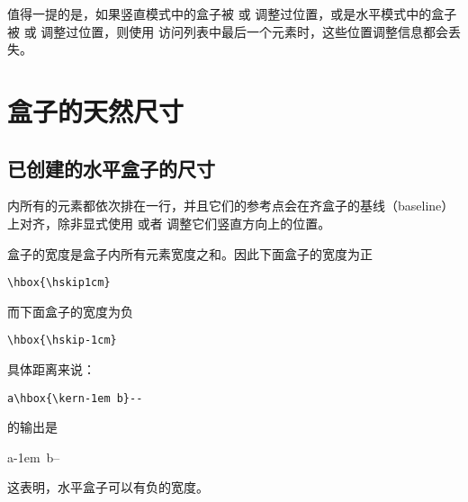 \documentclass{book}
\begin{document}
值得一提的是，如果竖直模式中的盒子被  或  调整过位置，或是水平模式中的盒子被  或  调整过位置，则使用  访问列表中最后一个元素时，这些位置调整信息都会丢失。

\section{盒子的天然尺寸}

\subsection{已创建的水平盒子的尺寸}

 内所有的元素都依次排在一行，并且它们的参考点会在齐盒子的基线（baseline）上对齐，除非显式使用  或者  调整它们竖直方向上的位置。

盒子的宽度是盒子内所有元素宽度之和。因此下面盒子的宽度为正
\begin{verbatim}
\hbox{\hskip1cm}
\end{verbatim}
而下面盒子的宽度为负
\begin{verbatim}
\hbox{\hskip-1cm}
\end{verbatim}
具体距离来说：
\begin{disp}\verb>a\hbox{\kern-1em b}-->\end{disp}
的输出是
\begin{disp}\leavevmode\hphantom{b}a\hbox{\kern-1em b}--\end{disp}
这表明，水平盒子可以有负的宽度。
\end{document}
